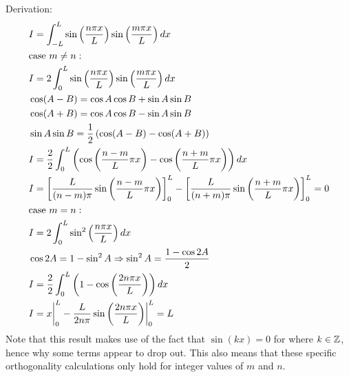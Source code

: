 \documentclass[11pt, fleqn]{article}
\begin{document}
Derivation:
\begin{align*}
    &I=\int_{-L}^L\sin\left( \frac{n\pi x}{L} \right)\sin\left( \frac{m\pi x}{L} \right)dx\\
    &\text{case }m\neq n:\\
    &I=2\int_{0}^L\sin\left( \frac{n\pi x}{L} \right)\sin\left( \frac{m\pi x}{L} \right)dx\\
    &\cos(A-B)=\cos A\cos B+\sin A\sin B\\
    &\cos(A+B)=\cos A\cos B-\sin A\sin B\\
    &\sin A\sin B=\frac{1}{2}\left( \cos(A-B)-\cos(A+B) \right)\\
    &I=\frac{2}{2}\int_0^L\left( \cos\left( \frac{n-m}{L}\pi x \right)-\cos\left( \frac{n+m}{L}\pi x \right) \right)dx\\
    &I=\left[ \frac{L}{(n-m)\pi}\sin\left( \frac{n-m}{L}\pi x \right) \right]_0^L-\left[ \frac{L}{(n+m)\pi}\sin\left( \frac{n+m}{L}\pi x \right) \right]_0^L=0\\
    &\text{case }m=n:\\
    &I=2\int_0^L\sin^2\left( \frac{n\pi x}{L} \right)dx\\
    &\cos 2A=1-\sin^2A\Rightarrow \sin^2 A=\frac{1-\cos 2A}{2}\\
    &I=\frac{2}{2}\int_0^L\left( 1-\cos\left( \frac{2n\pi x}{L} \right) \right)dx\\
    &I={x}\bigg\vert_0^L-{\frac{L}{2n\pi}\sin\left( \frac{2n\pi x}{L} \right)}\bigg\vert_0^L=L
\end{align*}
Note that this result makes use of the fact that $\sin(kx)=0$ for where $k\in\mathbb{Z}$, hence why some terms appear to drop out. This also means that these specific orthogonality calculations only hold for integer values of $m$ and $n$.
\end{document}
